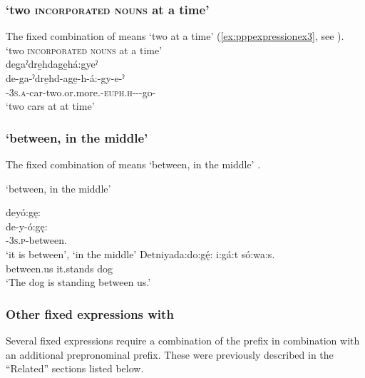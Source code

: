 \subsubsection*{ ‘two \textsc{incorporated nouns} at a time’} \label{[de+pronominal prefix+incorporated noun+age+hagyeˀ]}
The fixed combination of  means ‘two at a time’ (\ref{ex:pppexpressionex3}, see ).
\clearpage
\ea\label{ex:pppexpressionex3}  ‘two \textsc{incorporated nouns} at a time’\\
degaˀdre̱hdage̱há:gyeˀ\\
\gll de-ga-ˀdre̱hd-age̱-h-á:-gy-e-ˀ\\
{\dualic}-\textsc{3s.a}-car-two.or.more.{\stative}-\textsc{euph.h}-{\joinerA}-\exsc{\progressive}-go-{\stative}\\
\glt ‘two cars at at time’ 
\z


\subsubsection*{ ‘between, in the middle’} \label{[de+pronominal prefix+verb+ogę:]}
The fixed combination of  means ‘between, in the middle’ .

\ea\label{ex:pppexpressionex4}  ‘between, in the middle’

\ea deyó:gę: \\
\gll de-y-ó:gę:\\
{\dualic}-\textsc{3s.p}-between.{\stative}\\
\glt ‘it is between’, `in the middle'
\ex
\gll Detniyada:do:gę́: i:gá:t só:wa:s.\\
between.us it.stands dog\\
\glt ‘The dog is standing between us.’ 
\z
\z 

\subsubsection*{Other fixed expressions with  {\dualic}} \label{Other fixed expressions with [de-] (dualic)}
Several fixed expressions require a combination of the  {\dualic} prefix in combination with an additional prepronominal prefix. These were previously described in the “Related” sections listed below.
 
